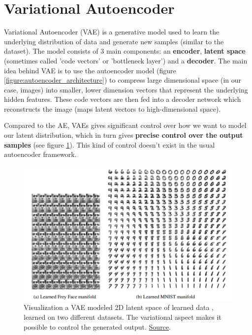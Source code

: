 \section{Variational Autoencoder}
\label{sec:vae}

Variational Autoencoder (VAE) \cite{vae} is a generative model used to learn the underlying distribution of data and generate new samples (similar to the dataset). The model consists of 3 main components: an \textbf{encoder}, \textbf{latent space} (sometimes called 'code vectors' or 'bottleneck layer') and a \textbf{decoder}. The main idea behind VAE is to use the autoencoder model \cite{autoencoder} \cite{autoencoder2} (figure \ref{figure:autoencoder_architecture}) to compress large dimensional space (in our case, images) into smaller, lower dimension vectors that represent the underlying hidden features. These code vectors are then fed into a decoder network which reconstructs the image (maps latent vectors to high-dimensional space).

Compared to the AE, VAEs gives significant control over how we want to model our latent distribution, which in turn gives \textbf{precise control over the output samples} (see figure \ref{fig:vae_control_latent_space}). This kind of control doesn't exist in the usual autoencoder framework.



\begin{figure}
    \centering
    \includegraphics[scale=0.5]{images/vae.png}
    \caption{Visualization a VAE modeled 2D latent space of learned data \cite{vae}, learned on two different datasets. The variational aspect makes it possible to control the generated output. \href{https://ar5iv.labs.arxiv.org/html/1804.00140}{Source}.}
    \label{fig:vae_control_latent_space}
\end{figure}

